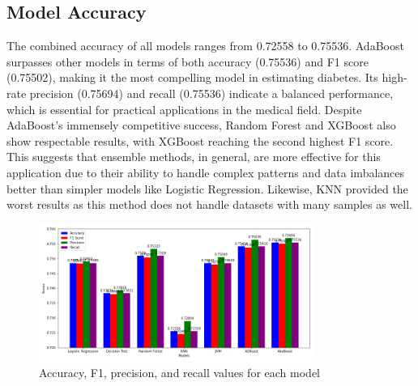 \documentclass[12pt]{article}
\begin{document}
\subsection{Model Accuracy}
The combined accuracy of all models ranges from 0.72558 to 0.75536. AdaBoost surpasses other models in terms of both accuracy (0.75536) and F1 score (0.75502), making it the most compelling model in estimating diabetes. Its high-rate precision (0.75694) and recall (0.75536) indicate a balanced performance, which is essential for practical applications in the medical field. Despite AdaBoost's immensely competitive success, Random Forest and XGBoost also show respectable results, with XGBoost reaching the second highest F1 score. This suggests that ensemble methods, in general, are more effective for this application due to their ability to handle complex patterns and data imbalances better than simpler models like Logistic Regression. Likewise, KNN provided the worst results as this method does not handle datasets with many samples as well.
\begin{figure}[H]
  \centering
  \includegraphics[width=0.8\textwidth]{combined.png}
  \caption{Accuracy, F1, precision, and recall values for each model}
  \label{fig:15}
\end{figure}
\end{document}
